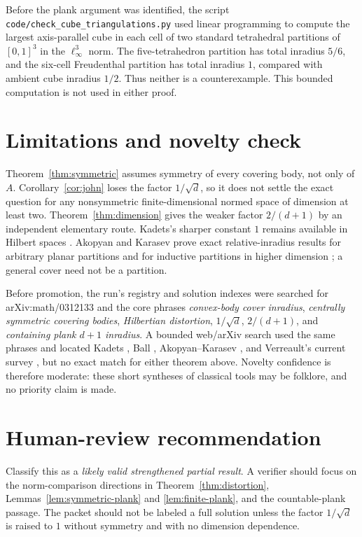 \documentclass[11pt]{article}
\theoremstyle{remark}
\begin{document}
Before the plank argument was identified, the script
\texttt{code/check\_cube\_triangulations.py} used linear programming to
compute the largest axis-parallel cube in each cell of two standard
tetrahedral partitions of \([0,1]^3\) in the \(\ell_\infty^3\) norm. The
five-tetrahedron partition has total inradius \(5/6\), and the six-cell
Freudenthal partition has total inradius \(1\), compared with ambient cube
inradius \(1/2\). Thus neither is a counterexample. This bounded computation
is not used in either proof.

\section{Limitations and novelty check}

Theorem~\ref{thm:symmetric} assumes symmetry of every covering body, not only
of \(A\). Corollary~\ref{cor:john} loses the factor \(1/\sqrt d\), so it does
not settle the exact question for any nonsymmetric finite-dimensional normed
space of dimension at least two. Theorem~\ref{thm:dimension} gives the weaker
factor \(2/(d+1)\) by an independent elementary route. Kadets's sharper
constant \(1\) remains available in Hilbert spaces \cite{Kadets}. Akopyan and
Karasev prove exact
relative-inradius results for arbitrary planar partitions and for inductive
partitions in higher dimension \cite{AK}; a general cover need not be a
partition.

Before promotion, the run's registry and solution indexes were searched for
arXiv:math/0312133 and the core phrases \emph{convex-body cover inradius},
\emph{centrally symmetric covering bodies}, \emph{Hilbertian distortion},
\(1/\sqrt d\), \(2/(d+1)\), and
\emph{containing plank \(d+1\) inradius}. A bounded web/arXiv search used the
same phrases and located Kadets \cite{Kadets}, Ball \cite{Ball},
Akopyan--Karasev \cite{AK}, and Verreault's current survey
\cite{Verreault}, but no exact match for either theorem above. Novelty
confidence is therefore moderate: these short syntheses of classical tools
may be folklore, and no priority claim is made.

\section{Human-review recommendation}

Classify this as a \emph{likely valid strengthened partial result}. A verifier
should focus on the norm-comparison directions in Theorem~\ref{thm:distortion},
Lemmas~\ref{lem:symmetric-plank} and \ref{lem:finite-plank}, and the
countable-plank passage. The packet should not be labeled a full solution
unless the factor \(1/\sqrt d\) is raised to \(1\) without symmetry and with
no dimension dependence.
\end{document}
